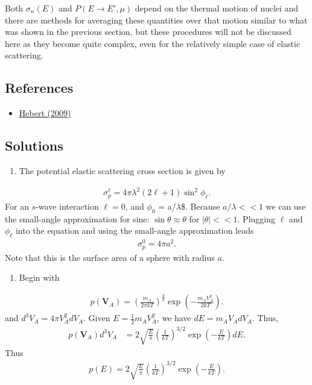 \documentclass[11pt]{article}
\renewcommand\vec{\mathbf}
\begin{document}
Both \(\sigma_n(E)\) and \(P(E \rightarrow E', \mu)\) depend on the thermal motion of nuclei and there are methods for averaging these quantities over that motion similar to what was shown in the previous section, but these procedures will not be discussed here as they become quite complex, even for the relatively simple case of elastic scattering.
\subsection{References}
\label{sec:orgheadline22}
\begin{itemize}
\item \href{Hebert2009}{Hebert (2009)}
\end{itemize}
\subsection{Solutions}
\label{sec:orgheadline23}
\begin{enumerate}
\item The potential elastic scattering cross section is given by
\end{enumerate}
\begin{align}
  \sigma_p^\ell = 4\pi \lambda^2 \left(2 \ell + 1 \right) \sin^2\phi_\ell.
\end{align}
For an \(s\)-wave interaction \(\ell = 0\), and \(\phi_0\) = a/\(\lambda\)\$.  Because \(a/\lambda << 1\) we can use the small-angle approximation for sine: \(\sin\theta \approx \theta\) for \(|\theta| << 1\).  Plugging \(\ell\) and \(\phi_\ell\) into the equation and using the small-angle approximation leads
\begin{align}
  \sigma_p^0 = 4\pi a^2.
\end{align}
Note that this is the surface area of a sphere with radius \(a\).
\begin{enumerate}
\item Begin with
\end{enumerate}
\begin{align}
  p(\vec{V}_A) = \left( \frac{m_A}{2\pi k T} \right)^\frac{3}{2} \exp\left(-\frac{m_A V_A^2}{2kT}\right) .
\end{align}
and \(d^3 V_A = 4\pi V_A^2 dV_A\).  Given \(E = \frac{1}{2}m_A V_A^2\), we have \(dE = m_A V_A dV_A\).  Thus,
\begin{align}
  p(\vec{V}_A) d^3 V_A &= 2 \sqrt{\frac{E}{\pi}} \left( \frac{1}{kT} \right)^{3/2} \exp\left( - \frac{E}{kT} \right) dE.
\end{align}
Thus
\begin{align}
  p(E) = 2 \sqrt{\frac{E}{\pi}} \left( \frac{1}{kT} \right)^{3/2} \exp\left( - \frac{E}{kT} \right).
\end{align}
\end{document}
